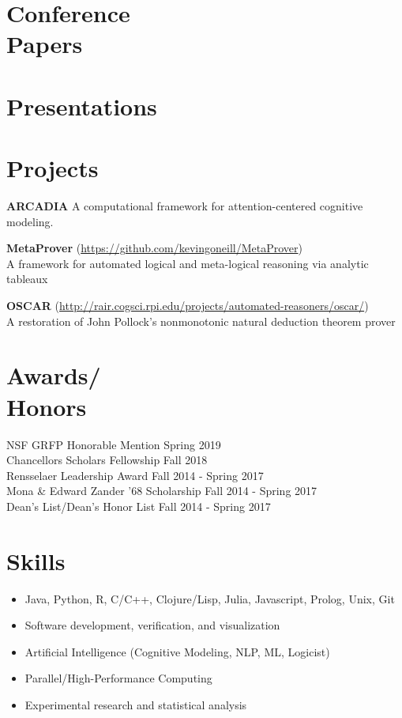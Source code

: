 \documentclass[margin]{res}
\begin{document}
\begin{resume}
  \section{Conference\\Papers}
  
  
  \section{Presentations}
  
  
  
  \section{Projects}
  \textbf{ARCADIA} A computational framework for attention-centered cognitive modeling.
  
  \textbf{MetaProver} (\url{https://github.com/kevingoneill/MetaProver})
  \\ A framework for automated logical and meta-logical reasoning via
  analytic tableaux

  \textbf{OSCAR} (\url{http://rair.cogsci.rpi.edu/projects/automated-reasoners/oscar/}) \\
  A restoration of John Pollock's nonmonotonic natural deduction theorem prover
  
  \section{Awards/\\Honors}
  NSF GRFP Honorable Mention \hfill Spring 2019 \\
  Chancellors Scholars Fellowship \hfill Fall 2018 \\
  Rensselaer Leadership Award \hfill Fall 2014 - Spring 2017 \\
  Mona \& Edward Zander '68 Scholarship \hfill Fall 2014 - Spring 2017 \\
  Dean's List/Dean's Honor List \hfill Fall 2014 - Spring 2017

  \section{Skills}
  \begin{itemize}
  \item Java, Python, R, C/C++, Clojure/Lisp, Julia, Javascript, Prolog, Unix, Git
  \item Software development, verification, and visualization
  \item Artificial Intelligence (Cognitive Modeling, NLP, ML, Logicist)
  \item Parallel/High-Performance Computing
  \item Experimental research and statistical analysis
  \end{itemize}
\end{resume}
\end{document}
